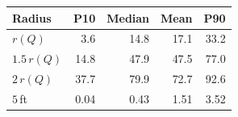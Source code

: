 \begin{tabular}{lrrrr}
\toprule
Radius & P10 & Median & Mean & P90\\
\midrule
$r(Q)$ & 3.6 & 14.8 & 17.1 & 33.2\\
$1.5\,r(Q)$ & 14.8 & 47.9 & 47.5 & 77.0\\
$2\,r(Q)$ & 37.7 & 79.9 & 72.7 & 92.6\\
$5$\,ft & 0.04 & 0.43 & 1.51 & 3.52\\
\bottomrule
\end{tabular}
